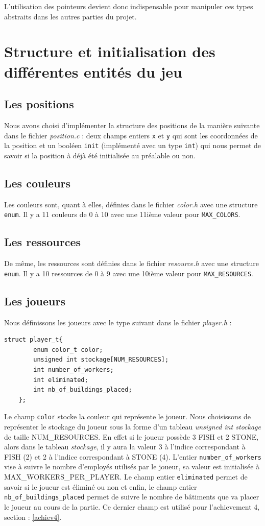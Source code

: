 \documentclass[a4paper,12pt]{report}
\begin{document}
L'utilisation des pointeurs devient donc indispensable pour manipuler ces types abstraits dans les autres parties du projet.

\section{Structure et initialisation des différentes entités du jeu} \label{structures}
\subsection{Les positions}
Nous avons choisi d'implémenter la structure des positions de la manière suivante dans le fichier \textit{position.c} : deux champs entiers \texttt{x} et \texttt{y} qui sont les coordonnées de la position et un booléen \texttt{init} (implémenté avec un type \texttt{int}) qui nous permet de savoir si la position à déjà été initialisée au préalable ou non.

\subsection{Les couleurs}
Les couleurs sont, quant à elles, définies dans le fichier \textit{color.h} avec une structure \texttt{enum}. Il y a 11 couleurs de 0 à 10 avec une 11ième valeur pour \texttt{MAX\_COLORS}.

\subsection{Les ressources}
De même, les ressources sont définies dans le fichier \textit{resource.h} avec une structure \texttt{enum}. Il y a 10 ressources de 0 à 9 avec une 10ième valeur pour \texttt{MAX\_RESOURCES}.

\subsection{Les joueurs}
Nous définissons les joueurs avec le type suivant dans le fichier \textit{player.h} : 
\begin{lstlisting}[caption={Structure joueur}, label={code:joueur}]
    struct player_t{
        enum color_t color;  
        unsigned int stockage[NUM_RESOURCES]; 
        int number_of_workers;
        int eliminated; 
        int nb_of_buildings_placed; 
    };
\end{lstlisting}
Le champ \texttt{color} stocke la couleur qui représente le joueur. Nous choisissons de représenter le stockage du joueur sous la forme d'un tableau \textit{unsigned int stockage} de taille NUM\_RESOURCES. En effet si le joueur possède 3 FISH et 2 STONE, alors dans le tableau \textit{stockage}, il y aura la valeur 3 à l'indice correspondant à FISH (2) et 2 à l'indice correspondant à STONE (4). L'entier \texttt{number\_of\_workers} vise à suivre le nombre d'employés utilisés par le joueur, sa valeur est initialisée à MAX\_WORKERS\_PER\_PLAYER. Le champ entier \texttt{eliminated} permet de savoir si le joueur est éliminé ou non et enfin, le champ entier \texttt{nb\_of\_buildings\_placed} permet de suivre le nombre de bâtiments que va placer le joueur au cours de la partie. Ce dernier champ est utilisé pour l'achievement 4, section : \ref{achiev4}.
\end{document}
